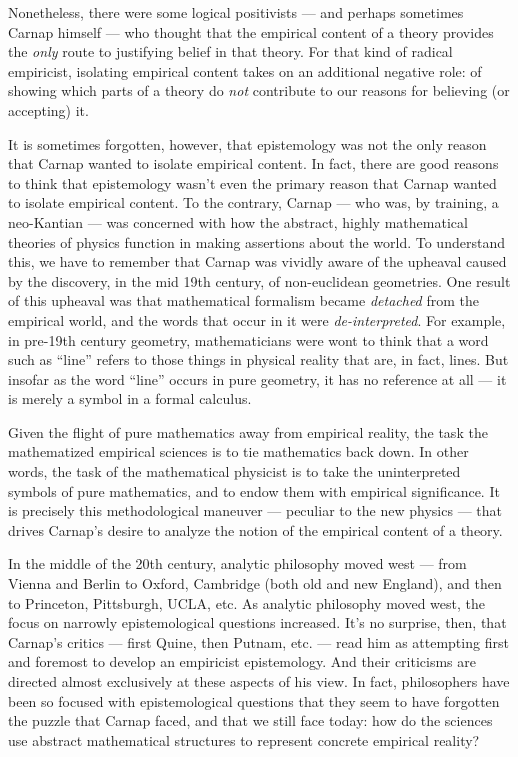 Nonetheless, there were some logical positivists --- and perhaps
sometimes Carnap himself --- who thought that the empirical content of
a theory provides the {\it only} route to justifying belief in that
theory.  For that kind of radical empiricist, isolating empirical
content takes on an additional negative role: of showing which parts
of a theory do {\it not} contribute to our reasons for believing (or
accepting) it.

It is sometimes forgotten, however, that epistemology was not the only
reason that Carnap wanted to isolate empirical content.  In fact,
there are good reasons to think that epistemology wasn't even the
primary reason that Carnap wanted to isolate empirical content.  To
the contrary, Carnap --- who was, by training, a neo-Kantian --- was
concerned with how the abstract, highly mathematical theories of
physics function in making assertions about the world.  To understand
this, we have to remember that Carnap was vividly aware of the
upheaval caused by the discovery, in the mid 19th century, of
non-euclidean geometries.  One result of this upheaval was that
mathematical formalism became {\it detached} from the empirical world,
and the words that occur in it were {\it de-interpreted}.  For
example, in pre-19th century geometry, mathematicians were wont to
think that a word such as ``line'' refers to those things in physical
reality that are, in fact, lines.  But insofar as the word ``line''
occurs in pure geometry, it has no reference at all --- it is merely a
symbol in a formal calculus.

Given the flight of pure mathematics away from empirical reality, the
task the mathematized empirical sciences is to tie mathematics back
down.  In other words, the task of the mathematical physicist is to
take the uninterpreted symbols of pure mathematics, and to endow them
with empirical significance.  It is precisely this methodological
maneuver --- peculiar to the new physics --- that drives Carnap's
desire to analyze the notion of the empirical content of a theory.

In the middle of the 20th century, analytic philosophy moved west ---
from Vienna and Berlin to Oxford, Cambridge (both old and new
England), and then to Princeton, Pittsburgh, UCLA, etc.  As analytic
philosophy moved west, the focus on narrowly epistemological questions
increased.  It's no surprise, then, that Carnap's critics --- first
Quine, then Putnam, etc. --- read him as attempting first and foremost
to develop an empiricist epistemology.  And their criticisms are
directed almost exclusively at these aspects of his view.  In fact,
philosophers have been so focused with epistemological questions that
they seem to have forgotten the puzzle that Carnap faced, and that we
still face today: how do the sciences use abstract mathematical
structures to represent concrete empirical reality?


